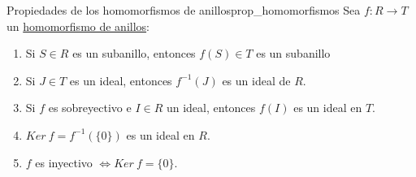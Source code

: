 \documentclass[10pt, a4paper]{article}
\newenvironment{enumeratea}{\begin{enumerate}[label=\arabic*)]}
{\end{enumerate}}
\begin{document}
\begin{proposition}{Propiedades de los homomorfismos de anillos}{prop_homomorfismos}
	Sea $f : R \longrightarrow T$ un \hyperref[def:homomorfismo]{homomorfismo de anillos}:
	\begin{enumeratea}
		\item Si $S \in R$ es un subanillo, entonces $f(S) \in T$ es un subanillo
		\item Si $J \in T$ es un ideal, entonces $f^{-1}(J)$ es un ideal de $R$.
		\item Si $f$ es sobreyectivo e $I \in R$ un ideal, entonces $f(I)$ es un ideal en $T$.
		\item $Ker\ f = f^{-1}(\{0\})$ es un ideal en $R$.
		\item $f$ es inyectivo $\iff Ker\ f = \{0\}$.
	\end{enumeratea}
\end{proposition}
\end{document}
